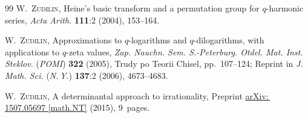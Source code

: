 \documentclass[12pt,reqno]{amsart}
\theoremstyle{remark}
\begin{document}
\begin{thebibliography}{99}
\textsc{W.~Zudilin},
Heine's basic transform and a permutation group for $q$-harmonic series,
\emph{Acta Arith.} \textbf{111}:2 (2004), 153--164.

\textsc{W.~Zudilin},
Approximations to $q$-logarithms and $q$-dilogarithms, with applications to $q$-zeta values,
\emph{Zap. Nauchn. Sem. S.-Peterburg. Otdel. Mat. Inst. Steklov.} (\emph{POMI}) \textbf{322} (2005), Trudy po Teorii Chisel, pp.~107--124;
Reprint in \emph{J. Math. Sci.} (\emph{N.\,Y.}) \textbf{137}:2 (2006), 4673--4683.

\textsc{W.~Zudilin},
A determinantal approach to irrationality,
Preprint \href{http://arxiv.org/abs/1507.05697}{arXiv:\,1507.05697 [math.NT]} (2015), 9~pages.

\end{thebibliography}
\end{document}
